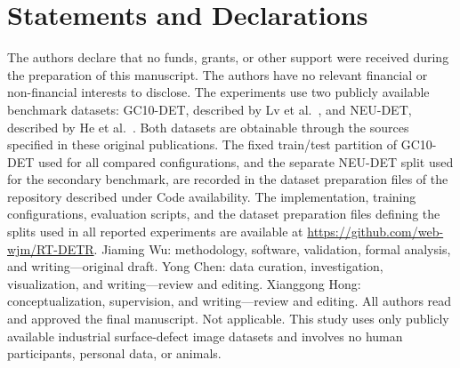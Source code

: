 \documentclass[pdflatex,sn-mathphys-num,iicol]{sn-jnl}
\begin{document}
\section*{Statements and Declarations}
The authors declare that no funds, grants, or other support were received during the preparation of this manuscript.
The authors have no relevant financial or non-financial interests to disclose.
The experiments use two publicly available benchmark datasets: GC10-DET, described by Lv et al.~\cite{lv2020gc10}, and NEU-DET, described by He et al.~\cite{he2020neudet}. Both datasets are obtainable through the sources specified in these original publications. The fixed train/test partition of GC10-DET used for all compared configurations, and the separate NEU-DET split used for the secondary benchmark, are recorded in the dataset preparation files of the repository described under Code availability.
The implementation, training configurations, evaluation scripts, and the dataset preparation files defining the splits used in all reported experiments are available at \url{https://github.com/web-wjm/RT-DETR}.
Jiaming Wu: methodology, software, validation, formal analysis, and writing---original draft. Yong Chen: data curation, investigation, visualization, and writing---review and editing. Xianggong Hong: conceptualization, supervision, and writing---review and editing. All authors read and approved the final manuscript.
Not applicable. This study uses only publicly available industrial surface-defect image datasets and involves no human participants, personal data, or animals.


\end{document}
